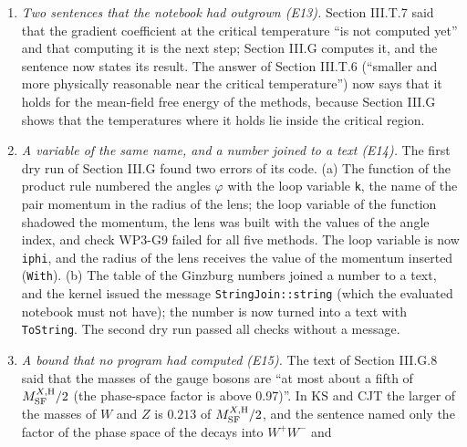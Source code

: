 \documentclass[
  10pt,
]{article}
\begin{document}
\begin{enumerate}
  program made them, so that six of them carried the identifiers of Rust
  checks of other statements (the error of item 11 again). The Python
  program now makes the counterpart of every Rust check under the
  identifier of the rule, and its earlier checks of statements without a
  Rust check (the slope in closed form, the two forms of the Ginzburg
  number, the quartic coefficient of CJT, the numbers of the Higgs
  sector, the row of the Standard Model) received Rust checks of the
  same statements, P3-G10 to P3-G12, P3-H3 and P3-H4. Found before the
  notebook was evaluated.
\item
  \emph{Two sentences that the notebook had outgrown (E13).} Section
  III.T.7 said that the gradient coefficient at the critical temperature
  ``is not computed yet'' and that computing it is the next step;
  Section III.G computes it, and the sentence now states its result. The
  answer of Section III.T.6 (``smaller and more physically reasonable
  near the critical temperature'') now says that it holds for the
  mean-field free energy of the methods, because Section III.G shows
  that the temperatures where it holds lie inside the critical region.
\item
  \emph{A variable of the same name, and a number joined to a text
  (E14).} The first dry run of Section III.G found two errors of its
  code. (a) The function of the product rule numbered the angles
  \(\varphi\) with the loop variable \texttt{k}, the name of the pair
  momentum in the radius of the lens; the loop variable of the function
  shadowed the momentum, the lens was built with the values of the angle
  index, and check WP3-G9 failed for all five methods. The loop variable
  is now \texttt{iphi}, and the radius of the lens receives the value of
  the momentum inserted (\texttt{With}). (b) The table of the Ginzburg
  numbers joined a number to a text, and the kernel issued the message
  \texttt{StringJoin::string} (which the evaluated notebook must not
  have); the number is now turned into a text with \texttt{ToString}.
  The second dry run passed all checks without a message.
\item
  \emph{A bound that no program had computed (E15).} The text of Section
  III.G.8 said that the masses of the gauge bosons are ``at most about a
  fifth of \(M^{X,{\rm H}}_{\rm SF}/2\) (the phase-space factor is above
  0.97)''. In KS and CJT the larger of the masses of \(W\) and \(Z\) is
  \(0.213\) of \(M^{X,{\rm H}}_{\rm SF}/2\), and the sentence named only
  the factor of the phase space of the decays into \(W^+W^-\) and

\end{enumerate}
\end{document}
